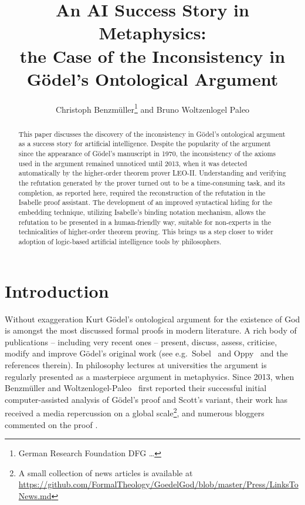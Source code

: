 \documentclass{article}
\title{An AI Success Story in Metaphysics: \\ the Case of the Inconsistency in G\"odel's Ontological Argument}
\author{Christoph Benzm\"uller\thanks{German Research Foundation DFG \ldots} and Bruno Woltzenlogel Paleo}
\author{}
\begin{document}
\maketitle

\begin{abstract}
  This paper discusses the discovery of the inconsistency in G\"odel's ontological argument as a success story for artificial intelligence. Despite the popularity of the argument since the appearance of G\"odel's manuscript in 1970, the inconsistency of the axioms used in the argument remained unnoticed until 2013, when it was detected automatically by the higher-order theorem prover LEO-II. Understanding and verifying the refutation generated by the prover turned out to be a time-consuming task, and its completion, as reported here, required the reconstruction of the refutation in the Isabelle proof assistant. The development of an improved syntactical hiding for the embedding technique, utilizing Isabelle's binding notation mechanism, allows the refutation to be presented in a human-friendly way, suitable for non-experts in the technicalities of higher-order theorem proving. This brings us a step closer to wider adoption of logic-based artificial intelligence tools by philosophers.
\end{abstract}


\section{Introduction}
Without exaggeration Kurt G\"{o}del's ontological
argument for the existence of God \cite{GoedelNotes,ScottNotes} is
amongst the most discussed formal proofs in modern literature. A rich
body of publications -- including very recent ones -- present,
discuss, assess, criticise, modify and improve G\"{o}del's original
work (see e.g.~Sobel~ and Oppy~ and the
references therein).  In philosophy lectures at universities the
argument is regularly presented as a masterpiece argument in
metaphysics. Since 2013, when Benzm\"uller and Woltzenlogel-Paleo~ first
reported their successful initial computer-assisted
analysis of G\"odel's proof and Scott's variant,
their work has received a media repercussion on a global scale\footnote{A
  small collection of news articles is available at {\scriptsize
    \url{https://github.com/FormalTheology/GoedelGod/blob/master/Press/LinksToNews.md}}},
and numerous bloggers commented on the proof
\cite{fuhrmann15:_blogg_goedel}.
\end{document}

